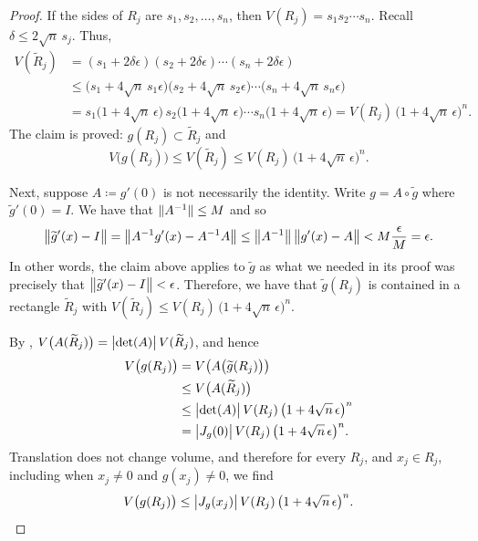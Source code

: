 \begin{proof}
If the sides of $R_j$ are $s_1,s_2,\ldots,s_n$, then
$V(R_j) = s_1 s_2 \cdots s_n$.   Recall $\delta \leq 2\sqrt{n} \, s_j$.
Thus,
\begin{equation*}
\begin{split}
V(\widetilde{R}_j) & =
(s_1+2\delta \epsilon )
(s_2+2\delta \epsilon )
\cdots
(s_n+2\delta \epsilon )
\\
& \leq
\bigl(s_1+4 \sqrt{n}\,s_1 \epsilon \bigr)
\bigl(s_2+4 \sqrt{n}\,s_2 \epsilon \bigr)
\cdots
\bigl(s_n+4 \sqrt{n}\,s_n \epsilon \bigr)
\\
& =
s_1 \bigl(1+4 \sqrt{n}\, \epsilon \bigr)
\,
s_2 \bigl(1+4 \sqrt{n}\, \epsilon \bigr)
\cdots
s_n \bigl(1+4 \sqrt{n}\, \epsilon \bigr)
=
V(R_j) \, {\bigl(1+4\sqrt{n} \, \epsilon\bigr)}^n .
\end{split}
\end{equation*}
The claim is proved: $g(R_j) \subset \widetilde{R}_j$ and
\begin{equation*}
V\bigl(g(R_j)\bigr) \leq V(\widetilde{R}_j) \leq V(R_j) \,
{\bigl(1+4\sqrt{n} \, \epsilon\bigr)}^n .
\end{equation*}

Next, suppose $A \coloneqq g'(0)$ is not necessarily the identity.
Write $g = A \circ \widetilde{g}$ where $\widetilde{g}'(0) = I$.
We have that $\lVert {A^{-1}} \rVert \leq M$ and so
\begin{equation*}
\bigl\lVert {\widetilde{g}'(x)-I} \bigr\rVert =
\bigl\lVert {A^{-1}g'(x)-A^{-1}A} \bigr\rVert \leq
\bigl\lVert {A^{-1}} \bigr\rVert\,\bigl\lVert {g'(x)-A} \bigr\rVert < M \frac{\epsilon}{M} = \epsilon .
\end{equation*}
In other words, the claim above applies to $\widetilde{g}$ as what we
needed in its proof was precisely that $\bigl\lVert {\widetilde{g}'(x)-I} \bigr\rVert < \epsilon$.
Therefore, we have that
$\widetilde{g}(R_j)$
is contained in a rectangle $\widetilde{R}_j$ with
$V(\widetilde{R}_j) \leq V(R_j) \, {\bigl(1+4\sqrt{n} \, \epsilon\bigr)}^n$.

By ,
$V\bigl(A(\widetilde{R}_j)\bigr) = \bigl\lvert {\det(A)} \bigr\rvert \, V(\widetilde{R}_j)$, and hence
\begin{equation*}
\begin{split}
V\bigl(g(R_j)\bigr) & =
V\bigl(A\bigl(\widetilde{g}(R_j)\bigr)\bigr)
\\
& \leq
V\bigl(A(\widetilde{R}_j)\bigr)
\\
& \leq
\bigl\lvert {\det(A)} \bigr\rvert \, V(R_j) \,
{\bigl(1+4\sqrt{n} \, \epsilon\bigr)}^n \\
& =
\bigl\lvert {J_g(0)} \bigr\rvert \, V(R_j) \,
{\bigl(1+4\sqrt{n} \, \epsilon\bigr)}^n .
\end{split}
\end{equation*}
Translation does not change volume, and therefore
for every $R_j$, and $x_j \in R_j$, including when $x_j \neq 0$ and $g(x_j)
\neq 0$, we find
\begin{equation*}
V\bigl(g(R_j)\bigr) \leq
\bigl\lvert {J_g(x_j)} \bigr\rvert \, V(R_j) \,
{\bigl(1+4\sqrt{n} \, \epsilon\bigr)}^n .
\end{equation*}


\end{proof}
